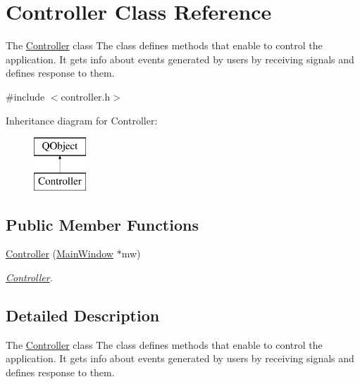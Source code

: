 \hypertarget{class_controller}{\section{Controller Class Reference}
\label{class_controller}
}


The \hyperlink{class_controller}{Controller} class The class defines methods that enable to control the application. It gets info about events generated by users by receiving signals and defines response to them.  




{\ttfamily \#include $<$controller.\-h$>$}

Inheritance diagram for Controller\-:\begin{figure}[H]
\begin{center}
\leavevmode
\includegraphics[height=2.000000cm]{class_controller}
\end{center}
\end{figure}
\subsection*{Public Member Functions}
\begin{DoxyCompactItemize}
\item 
\hyperlink{class_controller_a7925b6f339420ce2581a4c23c2f4a58c}{Controller} (\hyperlink{class_main_window}{Main\-Window} $\ast$mw)
\begin{DoxyCompactList}\small\item\em \hyperlink{class_controller}{Controller}. \end{DoxyCompactList}\end{DoxyCompactItemize}


\subsection{Detailed Description}
The \hyperlink{class_controller}{Controller} class The class defines methods that enable to control the application. It gets info about events generated by users by receiving signals and defines response to them. 

